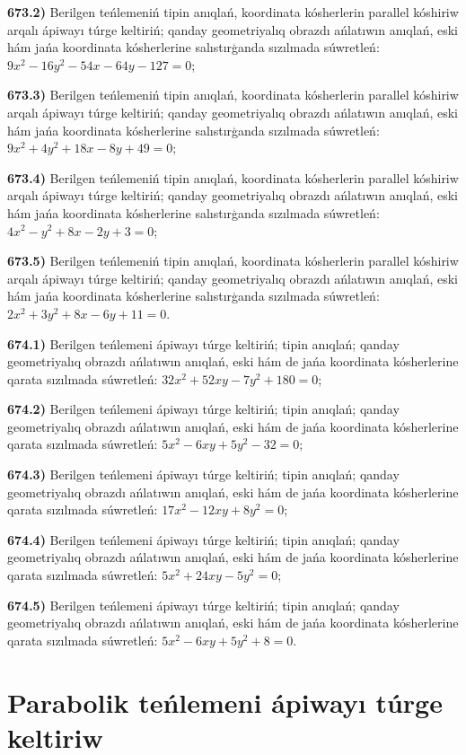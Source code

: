 \textbf{673.2)} Berilgen teńlemeniń tipin anıqlań, koordinata kósherlerin parallel kóshiriw arqalı ápiwayı túrge keltiriń; qanday geometriyalıq obrazdı ańlatıwın anıqlań, eski hám jańa koordinata kósherlerine salıstırģanda sızılmada súwretleń: $9 x^2-16 y^2-54 x-64 y-127=0$;

\textbf{673.3)} Berilgen teńlemeniń tipin anıqlań, koordinata kósherlerin parallel kóshiriw arqalı ápiwayı túrge keltiriń; qanday geometriyalıq obrazdı ańlatıwın anıqlań, eski hám jańa koordinata kósherlerine salıstırģanda sızılmada súwretleń:  $9 x^2+4 y^2+18 x-8 y+49=0$;

\textbf{673.4)} Berilgen teńlemeniń tipin anıqlań, koordinata kósherlerin parallel kóshiriw arqalı ápiwayı túrge keltiriń; qanday geometriyalıq obrazdı ańlatıwın anıqlań, eski hám jańa koordinata kósherlerine salıstırģanda sızılmada súwretleń: $4 x^2-y^2+8 x-2 y+3=0$;

\textbf{673.5)} Berilgen teńlemeniń tipin anıqlań, koordinata kósherlerin parallel kóshiriw arqalı ápiwayı túrge keltiriń; qanday geometriyalıq obrazdı ańlatıwın anıqlań, eski hám jańa koordinata kósherlerine salıstırģanda sızılmada súwretleń: $2 x^2+3 y^2+8 x-6 y+11=0$.

\textbf{674.1)} Berilgen teńlemeni ápiwayı túrge keltiriń; tipin anıqlań; qanday geometriyalıq obrazdı ańlatıwın anıqlań, eski hám de jańa koordinata kósherlerine qarata sızılmada súwretleń: $32 x^2+52 x y-7 y^2+180=0$;

\textbf{674.2)} Berilgen teńlemeni ápiwayı túrge keltiriń; tipin anıqlań; qanday geometriyalıq obrazdı ańlatıwın anıqlań, eski hám de jańa koordinata kósherlerine qarata sızılmada súwretleń: $5 x^2-6 x y+5 y^2-32=0$;

\textbf{674.3)} Berilgen teńlemeni ápiwayı túrge keltiriń; tipin anıqlań; qanday geometriyalıq obrazdı ańlatıwın anıqlań, eski hám de jańa koordinata kósherlerine qarata sızılmada súwretleń: $17 x^2-12 x y+8 y^2=0$;

\textbf{674.4)} Berilgen teńlemeni ápiwayı túrge keltiriń; tipin anıqlań; qanday geometriyalıq obrazdı ańlatıwın anıqlań, eski hám de jańa koordinata kósherlerine qarata sızılmada súwretleń:  $5 x^2+24 x y-5 y^2=0$;

\textbf{674.5)} Berilgen teńlemeni ápiwayı túrge keltiriń; tipin anıqlań; qanday geometriyalıq obrazdı ańlatıwın anıqlań, eski hám de jańa koordinata kósherlerine qarata sızılmada súwretleń: $5 x^2-6 x y+5 y^2+8=0$.



\section{ Parabolik teńlemeni ápiwayı túrge keltiriw}



